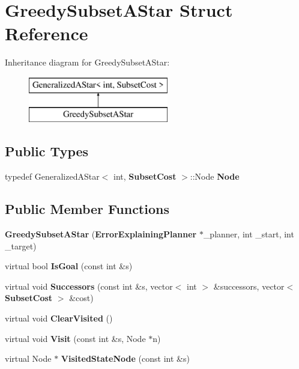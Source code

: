 \section{Greedy\+Subset\+A\+Star Struct Reference}
\label{structGreedySubsetAStar}
Inheritance diagram for Greedy\+Subset\+A\+Star\+:\begin{figure}[H]
\begin{center}
\leavevmode
\includegraphics[height=2.000000cm]{structGreedySubsetAStar}
\end{center}
\end{figure}
\subsection*{Public Types}
\begin{DoxyCompactItemize}
\item 
typedef Generalized\+A\+Star$<$ int, {\bf Subset\+Cost} $>$\+::Node {\bfseries Node}\label{structGreedySubsetAStar_aa96ac65adfcc7e041d5a7d9b49d2a08a}

\end{DoxyCompactItemize}
\subsection*{Public Member Functions}
\begin{DoxyCompactItemize}
\item 
{\bfseries Greedy\+Subset\+A\+Star} ({\bf Error\+Explaining\+Planner} $\ast$\+\_\+planner, int \+\_\+start, int \+\_\+target)\label{structGreedySubsetAStar_aa1dc8a9972761c588685ab024bc2dee3}

\item 
virtual bool {\bfseries Is\+Goal} (const int \&s)\label{structGreedySubsetAStar_a2f45fea4ebce83ed921571ff4e542073}

\item 
virtual void {\bfseries Successors} (const int \&s, vector$<$ int $>$ \&successors, vector$<$ {\bf Subset\+Cost} $>$ \&cost)\label{structGreedySubsetAStar_a5d9d5edc72e649d2aa0069b748ed11d5}

\item 
virtual void {\bfseries Clear\+Visited} ()\label{structGreedySubsetAStar_a42096bab60e1f61a164c6c56f315f36a}

\item 
virtual void {\bfseries Visit} (const int \&s, Node $\ast$n)\label{structGreedySubsetAStar_a3248d8712532af4f0161e9db5118bd3c}

\item 
virtual Node $\ast$ {\bfseries Visited\+State\+Node} (const int \&s)\label{structGreedySubsetAStar_a04fa5416bf5ca260ca00f1930f632079}

\end{DoxyCompactItemize}
